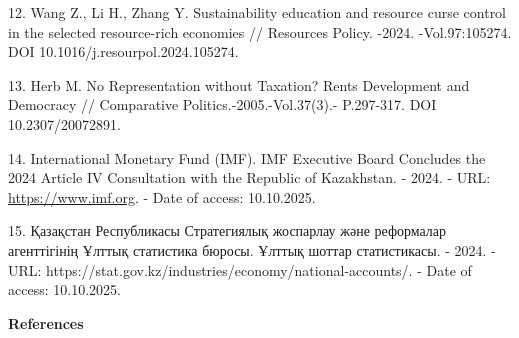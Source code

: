 \begin{refs}
12. Wang Z., Li H., Zhang Y. Sustainability education and resource curse
control in the selected resource-rich economies // Resources Policy.
-2024. -Vol.97:105274. DOI 10.1016/j.resourpol.2024.105274.

13. Herb M. No Representation without Taxation? Rents Development and
Democracy // Comparative Politics.-2005.-Vol.37(3).- P.297-317. DOI
10.2307/20072891.

14. International Monetary Fund (IMF). IMF Executive Board Concludes the
2024 Article IV Consultation with the Republic of Kazakhstan. - 2024. - URL:
\href{https://www.imf.org/en/news/articles/2025/01/30/pr25021-kazakhstan-executive-board-concludes-2024-article-iv-consult}{https://www.imf.org}. - Date of access: 10.10.2025.

15. Қазақстан Республикасы Стратегиялық жоспарлау және реформалар
агенттігінің Ұлттық статистика бюросы. Ұлттық шоттар статистикасы. -
2024. - URL: https://stat.gov.kz/industries/economy/national-accounts/.
- Date of access: 10.10.2025.
\end{refs}

\begin{center}
{\bfseries References}
\end{center}

